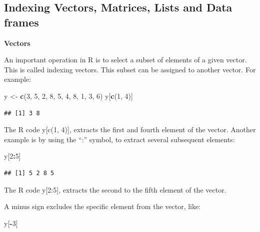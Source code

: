 \documentclass[]{book}
\newenvironment{Shaded}{\begin{snugshade}}{\end{snugshade}}
\newcommand{\KeywordTok}[1]{\textcolor[rgb]{0.13,0.29,0.53}{\textbf{#1}}}
\newcommand{\DecValTok}[1]{\textcolor[rgb]{0.00,0.00,0.81}{#1}}
\newcommand{\StringTok}[1]{\textcolor[rgb]{0.31,0.60,0.02}{#1}}
\newcommand{\OperatorTok}[1]{\textcolor[rgb]{0.81,0.36,0.00}{\textbf{#1}}}
\newcommand{\NormalTok}[1]{#1}
\begin{document}
\subsection{Indexing Vectors, Matrices, Lists and Data
frames}\label{indexing-vectors-matrices-lists-and-data-frames}

\textbf{Vectors}

An important operation in R is to select a subset of elements of a given
vector. This is called indexing vectors. This subset can be assigned to
another vector. For example:

\begin{Shaded}
\begin{Highlighting}[]
\NormalTok{y <-}\StringTok{ }\KeywordTok{c}\NormalTok{(}\DecValTok{3}\NormalTok{, }\DecValTok{5}\NormalTok{, }\DecValTok{2}\NormalTok{, }\DecValTok{8}\NormalTok{, }\DecValTok{5}\NormalTok{, }\DecValTok{4}\NormalTok{, }\DecValTok{8}\NormalTok{, }\DecValTok{1}\NormalTok{, }\DecValTok{3}\NormalTok{, }\DecValTok{6}\NormalTok{)}
\NormalTok{y[}\KeywordTok{c}\NormalTok{(}\DecValTok{1}\NormalTok{, }\DecValTok{4}\NormalTok{)]}
\end{Highlighting}
\end{Shaded}

\begin{verbatim}
## [1] 3 8
\end{verbatim}

The R code y{[}c(1, 4){]}, extracts the first and fourth element of the
vector. Another example is by using the ``:'' symbol, to extract several
subsequent elements:

\begin{Shaded}
\begin{Highlighting}[]
\NormalTok{y[}\DecValTok{2}\OperatorTok{:}\DecValTok{5}\NormalTok{]}
\end{Highlighting}
\end{Shaded}

\begin{verbatim}
## [1] 5 2 8 5
\end{verbatim}

The R code y{[}2:5{]}, extracts the second to the fifth element of the
vector.

A minus sign excludes the specific element from the vector, like:

\begin{Shaded}
\begin{Highlighting}[]
\NormalTok{y[}\OperatorTok{-}\DecValTok{3}\NormalTok{]}
\end{Highlighting}
\end{Shaded}
\end{document}
